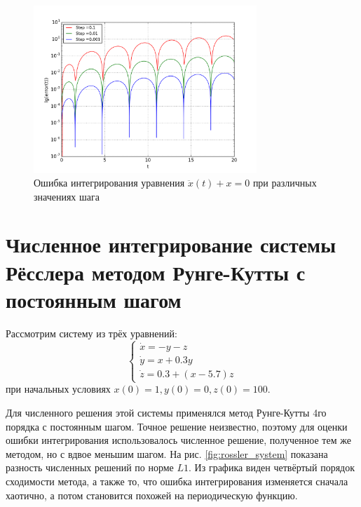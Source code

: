 \documentclass[a4paper]{article}
\begin{document}
\begin{figure}[H]
	\center
  \includegraphics[width=0.75\textwidth]{../pictures/lab3_cons_system.png}
  \caption{Ошибка интегрирования уравнения \(\ddot x(t) +x = 0\) при различных значениях шага}
  \label{fig:euler_system}
\end{figure}

\section{Численное интегрирование системы Рёсслера методом Рунге-Кутты с постоянным шагом}

Рассмотрим систему из трёх уравнений:
\begin{displaymath}
	\left\{
  \begin{array}{lr}
    \dot x = -y - z\\
		\dot y = x + 0.3y \\
    \dot z = 0.3 + (x-5.7)z
  \end{array}
\right.
\end{displaymath}
при начальных условиях \(x(0)=1,y(0)=0,z(0)=100\).

Для численного решения этой системы применялся метод Рунге-Кутты 4го порядка с
постоянным шагом. Точное решение неизвестно, поэтому для оценки ошибки интегрирования
использовалось численное решение, полученное тем же методом, но с вдвое меньшим шагом.
На рис. \ref{fig:rossler_system} показана разность численных решений по норме \(L1\).
Из графика виден четвёртый порядок сходимости метода, а также то, что ошибка интегрирования
изменяется сначала хаотично, а потом становится похожей на периодическую функцию.
\end{document}
